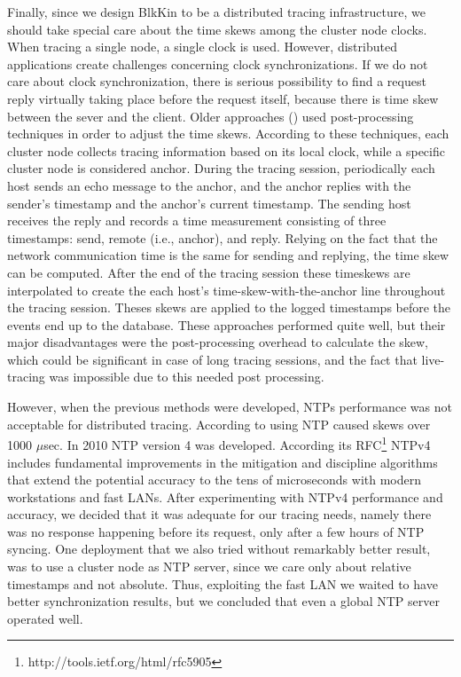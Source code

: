 Finally, since we design BlkKin to be a distributed tracing infrastructure, we
should take special care about the time skews among the cluster node clocks.
When tracing a single node, a single clock is used. However, distributed
applications create challenges concerning clock synchronizations. If we do not
care about clock synchronization, there is serious possibility to find a request
reply virtually taking place before the request itself, because there is time
skew between the sever and the client. Older approaches (\cite{hp}) used
post-processing techniques in order to adjust the time skews. According to these
techniques, each cluster node collects tracing information based on its local
clock, while a specific cluster node is considered anchor. During the tracing
session, periodically each host sends an echo message to the anchor, and the
anchor replies with the sender's timestamp and the anchor's current timestamp.
The sending host receives the reply and records a time measurement consisting of
three timestamps: send, remote (i.e., anchor), and reply. Relying on the fact
that the network communication time is the same for sending and replying, the
time skew can be computed. After the end of the tracing session these timeskews
are interpolated to create the each host's time-skew-with-the-anchor line
throughout the tracing session. Theses skews are applied to the logged
timestamps before the events end up to the database. These approaches performed
quite well, but their major disadvantages were the post-processing overhead to
calculate the skew, which could be significant in case of long tracing sessions,
and the fact that live-tracing was impossible due to this needed post
processing.

However, when the previous methods were developed, NTPs performance was not
acceptable for distributed tracing. According to \cite{hp} using NTP caused
skews over 1000 $\mu$sec. In 2010 NTP version 4 was developed. According its
RFC\footnote{http://tools.ietf.org/html/rfc5905} NTPv4 includes fundamental
improvements in the mitigation and discipline algorithms that extend the
potential accuracy to the tens of microseconds with modern workstations and fast
LANs. After experimenting with NTPv4 performance and accuracy, we decided that
it was adequate for our tracing needs, namely there was no response happening
before its request, only after a few hours of NTP syncing. One deployment that
we also tried without remarkably better result, was to use a cluster node as NTP
server, since we care only about relative timestamps and not absolute. Thus,
exploiting the fast LAN we waited to have better synchronization results, but we
concluded that even a global NTP server operated well.

